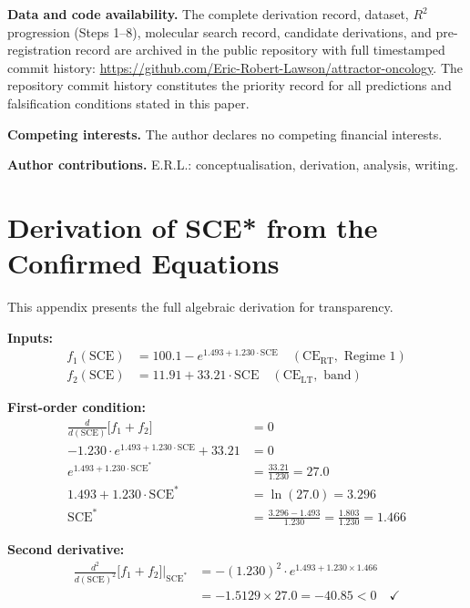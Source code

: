 \documentclass[11pt]{article}
\theoremstyle{plain}
\theoremstyle{definition}
\theoremstyle{remark}
\begin{document}
\bigskip
\noindent\textbf{Data and code availability.}
The complete derivation record, dataset, $R^2$ progression (Steps 1--8),
molecular search record, candidate derivations, and pre-registration record
are archived in the public repository with full timestamped commit history:
\url{https://github.com/Eric-Robert-Lawson/attractor-oncology}.
The repository commit history constitutes the priority record for all predictions
and falsification conditions stated in this paper.

\noindent\textbf{Competing interests.}
The author declares no competing financial interests.

\noindent\textbf{Author contributions.}
E.R.L.: conceptualisation, derivation, analysis, writing.

\appendix

\section{Derivation of SCE* from the Confirmed Equations}
\label{app:derivation}

This appendix presents the full algebraic derivation for transparency.

\medskip\noindent\textbf{Inputs:}
\begin{align*}
  f_1(\mathrm{SCE}) &= 100.1 - e^{1.493 + 1.230 \cdot \mathrm{SCE}}
  \quad(\text{CE}_\mathrm{RT}, \text{ Regime 1})\\
  f_2(\mathrm{SCE}) &= 11.91 + 33.21 \cdot \mathrm{SCE}
  \quad(\text{CE}_\mathrm{LT}, \text{ band})
\end{align*}

\noindent\textbf{First-order condition:}
\begin{align*}
  \frac{d}{d(\mathrm{SCE})}\bigl[f_1 + f_2\bigr] &= 0\\
  -1.230 \cdot e^{1.493 + 1.230 \cdot \mathrm{SCE}} + 33.21 &= 0\\
  e^{1.493 + 1.230 \cdot \mathrm{SCE}^*} &= \frac{33.21}{1.230} = 27.0\\
  1.493 + 1.230 \cdot \mathrm{SCE}^* &= \ln(27.0) = 3.296\\
  \mathrm{SCE}^* &= \frac{3.296 - 1.493}{1.230} = \frac{1.803}{1.230} = 1.466
\end{align*}

\noindent\textbf{Second derivative:}
\begin{align*}
  \frac{d^2}{d(\mathrm{SCE})^2}\bigl[f_1 + f_2\bigr]\Big|_{\mathrm{SCE}^*}
  &= -(1.230)^2 \cdot e^{1.493 + 1.230 \times 1.466}\\
  &= -1.5129 \times 27.0 = -40.85 < 0 \quad\checkmark
\end{align*}
\end{document}
